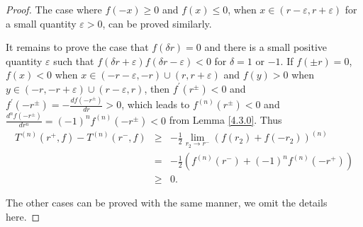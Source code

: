 \documentclass{article}
\begin{document}
\begin{proof}
    The case where $f(-x)\geq 0$ and $f(x)\leq 0$, when $x\in(r-\varepsilon, r+\varepsilon)$ for a small quantity $\varepsilon>0$, can be proved similarly.

    It remains to prove the case that $f(\delta r)=0$ and there is a small positive quantity $\varepsilon$ such that $f(\delta r+\varepsilon)f(\delta r-\varepsilon)<0$ for $\delta=1$ or $-1$. If $f(\pm r)=0$, $f(x)<0$ when $x\in (-r-\varepsilon, -r)\cup (r, r+\varepsilon)$ and $f(y)>0$ when $y\in (-r, -r+\varepsilon)\cup (r-\varepsilon, r)$, then $f^{'}(r^{\pm})<0$ and $f^{'}(-r^{\pm})=-\frac{df(-r^{\pm})}{dr}>0$, which leads to $f^{(n)}(r^{\pm})<0$ and $\frac{d^{n}f(-r^{\pm})}{dr^{n}}=(-1)^{n}f^{(n)}(-r^{\pm})<0$ from Lemma \ref{4.3.0}. Thus
    \begin{eqnarray*}
        T^{(n)}(r^{+}, f)-T^{(n)}(r^{-}, f)
        &\geq&-\frac{1}{2}\lim\limits_{r_{2}\rightarrow r^{-}}\left(f(r_{2})+f(-r_{2})\right)^{(n)}\\
        &=& -\frac{1}{2}\left(f^{(n)}(r^{-})+(-1)^{n}f^{(n)}(-r^{+})\right)\\
        &\geq& 0.
    \end{eqnarray*}

    The other cases can be proved with the same manner, we omit the details here.
\end{proof}
\end{document}
